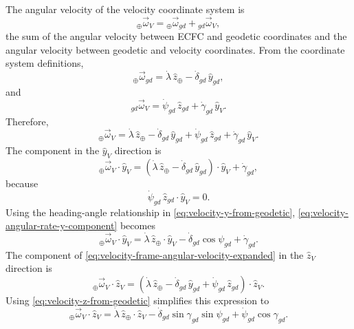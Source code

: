 The angular velocity of the velocity coordinate system is
\begin{equation}
  {}_{\oplus}\vec\omega_V
  ={}_{\oplus}\vec\omega_{gd}
   +{}_{gd}\vec\omega_V,
  \label{eq:velocity-frame-angular-velocity-sum}
\end{equation}
the sum of the angular velocity between ECFC and geodetic coordinates and the
angular velocity between geodetic and velocity coordinates. From the coordinate
system definitions,
\begin{equation}
  {}_{\oplus}\vec\omega_{gd}
  =\dot\lambda\,\hat z_{\oplus}
   -\dot\delta_{gd}\,\hat y_{gd},
  \label{eq:ecfc-to-geodetic-angular-velocity}
\end{equation}
and
\begin{equation}
  {}_{gd}\vec\omega_V
  =\dot\psi_{gd}\,\hat z_{gd}
   +\dot\gamma_{gd}\,\hat y_V.
  \label{eq:geodetic-to-velocity-angular-velocity}
\end{equation}
Therefore,
\begin{equation}
  {}_{\oplus}\vec\omega_V
  =\dot\lambda\,\hat z_{\oplus}
   -\dot\delta_{gd}\,\hat y_{gd}
   +\dot\psi_{gd}\,\hat z_{gd}
   +\dot\gamma_{gd}\,\hat y_V.
  \label{eq:velocity-frame-angular-velocity-expanded}
\end{equation}
The component in the $\hat y_V$ direction is
\begin{equation}
  {}_{\oplus}\vec\omega_V\mathbin{\cdot}\hat y_V
  =\left(
      \dot\lambda\,\hat z_{\oplus}
      -\dot\delta_{gd}\,\hat y_{gd}
    \right)\mathbin{\cdot}\hat y_V
   +\dot\gamma_{gd},
  \label{eq:velocity-angular-rate-y-component}
\end{equation}
because
\begin{equation}
  \dot\psi_{gd}\,\hat z_{gd}\mathbin{\cdot}\hat y_V=0.
  \label{eq:heading-term-orthogonal-yv}
\end{equation}
Using the heading-angle relationship in \cref{eq:velocity-y-from-geodetic},
\cref{eq:velocity-angular-rate-y-component} becomes
\begin{equation}
  {}_{\oplus}\vec\omega_V\mathbin{\cdot}\hat y_V
  =\dot\lambda\,\hat z_{\oplus}\mathbin{\cdot}\hat y_V
   -\dot\delta_{gd}\cos\psi_{gd}
   +\dot\gamma_{gd}.
  \label{eq:velocity-angular-rate-y-simplified}
\end{equation}
The component of \cref{eq:velocity-frame-angular-velocity-expanded} in the
$\hat z_V$ direction is
\begin{equation}
  {}_{\oplus}\vec\omega_V\mathbin{\cdot}\hat z_V
  =\left(
      \dot\lambda\,\hat z_{\oplus}
      -\dot\delta_{gd}\,\hat y_{gd}
      +\dot\psi_{gd}\,\hat z_{gd}
    \right)\mathbin{\cdot}\hat z_V.
  \label{eq:velocity-angular-rate-z-component}
\end{equation}
Using \cref{eq:velocity-z-from-geodetic} simplifies this expression to
\begin{equation}
  {}_{\oplus}\vec\omega_V\mathbin{\cdot}\hat z_V
  =\dot\lambda\,\hat z_{\oplus}\mathbin{\cdot}\hat z_V
   -\dot\delta_{gd}\sin\gamma_{gd}\sin\psi_{gd}
   +\dot\psi_{gd}\cos\gamma_{gd}.
  \label{eq:velocity-angular-rate-z-simplified}
\end{equation}

